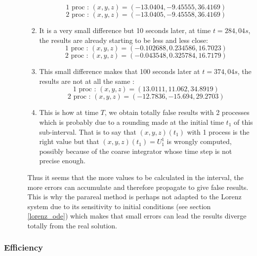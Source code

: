 \begin{enumerate}[label=\textbullet]
\begin{itemize}[label=-]
\begin{enumerate}[label=\ding{213}]
			$$\text{1 proc : } (x,y,z)=( -13.0404,-9.45555,36.4169)$$
			$$\text{2 proc : } (x,y,z)=(-13.0405,-9.45558,36.4169)$$
			\item It is a very small difference but 10 seconds later, at time $t=284,04s$, the results are already starting to be less and less close:
			$$\text{1 proc : } (x,y,z)=( -0.102688,0.234586,16.7023)$$
			$$\text{2 proc : } (x,y,z)=(-0.043548,0.325784,16.7179)$$
			\item This small difference makes that 100 seconds later at $t=374,04s$, the results are not at all the same :
			$$\text{1 proc : } (x,y,z)=(13.0111,11.062,34.8919)$$
			$$\text{2 proc : } (x,y,z)=(-12.7836,-15.694,29.2703)$$
			\item This is how at time $T$, we obtain totally false results with 2 processes which is probably due to a rounding made at the initial time $t_1$ of this sub-interval. That is to say that $(x,y,z)(t_1)$ with 1 process is the right value but that $(x,y,z)(t_1)=U_1^1$ is wrongly computed, possibly because of the coarse integrator whose time step is not precise enough.
		\end{enumerate}
		Thus it seems that the more values to be calculated in the interval, the more errors can accumulate and therefore propagate to give false results. This is why the parareal method is perhaps not adapted to the Lorenz system due to its sensitivity to initial conditions (see section \ref{lorenz_ode}) which makes that small errors can lead the results diverge totally from the real solution.
	\end{itemize}
\end{enumerate}


\subsubsection{Efficiency}

